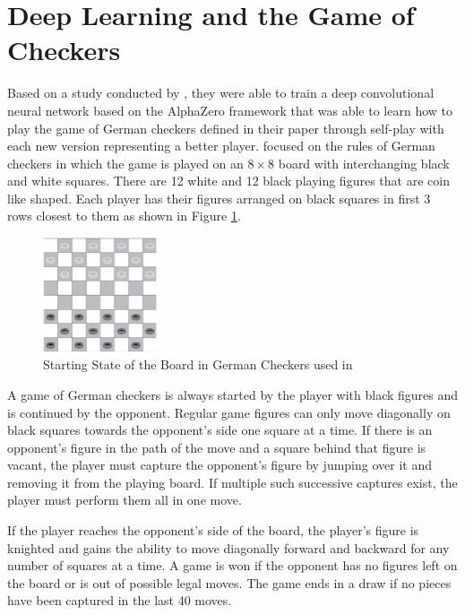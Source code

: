 \section{Deep Learning and the Game of Checkers}

Based on a study conducted by \cite{Popic_Boskovic_Brest_2021}, they were able to train a deep convolutional neural network based on the AlphaZero framework that was able to learn how to play the game of German checkers defined in their paper through self-play with each new version representing a better player. \cite{Popic_Boskovic_Brest_2021} focused on the rules of German checkers in which the game is played on an $8 \times 8$ board with interchanging black and white squares. There are 12 white and 12 black playing figures that are coin like shaped. Each player has their figures arranged on black squares in first 3 rows closest to them as shown in Figure \ref{fig:checkers-start}. 

\begin{figure}[htb]
    \centering
    \includegraphics[width=0.3\textwidth]{images/checkers.png}
    \caption{Starting State of the Board in German Checkers used in \cite{Popic_Boskovic_Brest_2021}}
    \label{fig:checkers-start}
\end{figure}

A game of German checkers is always started by the player with black figures and is continued by the opponent. Regular game figures can only move diagonally on black squares towards the opponent’s side one square at a time. If there is an opponent’s figure in the path of the move and a square behind that figure is vacant, the player must capture the opponent’s figure by jumping over it and removing it from the playing board. If multiple such successive captures exist, the player must perform them all in one move.

If the player reaches the opponent’s side of the board, the player’s figure is knighted and gains the ability to move diagonally forward and backward for any number of squares at a time. A game is won if the opponent has no figures left on the board or is out of possible legal moves. The game ends in a draw if no pieces have been captured in the last 40 moves.

